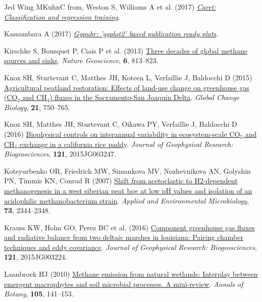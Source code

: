 \documentclass[
  12pt,
]{article}
\newlength{\cslhangindent}
\newenvironment{CSLReferences}[2] %
 {\begin{list}{}{%
  \setlength{\itemindent}{0pt}
  \setlength{\leftmargin}{0pt}
  \setlength{\parsep}{0pt}
  \ifodd #1
   \setlength{\leftmargin}{\cslhangindent}
   \setlength{\itemindent}{-1\cslhangindent}
  \fi
  \setlength{\itemsep}{#2\baselineskip}}}
 {\end{list}}
\begin{document}
\begin{CSLReferences}{1}{0}
Jed Wing MKuhnC from, Weston S, Williams A et al. (2017)
\emph{\emph{\href{https://CRAN.R-project.org/package=caret}{Caret:
Classification and regression training}}}.

Kassambara A (2017)
\emph{\emph{\href{https://CRAN.R-project.org/package=ggpubr}{Ggpubr:
'ggplot2' based publication ready plots}}}.

Kirschke S, Bousquet P, Ciais P et al. (2013)
\href{https://doi.org/10.1038/ngeo1955}{Three decades of global methane
sources and sinks}. \emph{Nature Geoscience}, \textbf{6}, 813--823.

Knox SH, Sturtevant C, Matthes JH, Koteen L, Verfaillie J, Baldocchi D
(2015) \href{https://doi.org/10.1111/gcb.12745}{Agricultural peatland
restoration: Effects of land-use change on greenhouse gas ({CO}\(_2\)
and {CH}\(_4\)) fluxes in the {Sacramento-San Joaquin Delta}}.
\emph{Global Change Biology}, \textbf{21}, 750--765.

Knox SH, Matthes JH, Sturtevant C, Oikawa PY, Verfaillie J, Baldocchi D
(2016) \href{https://doi.org/10.1002/2015JG003247}{Biophysical controls
on interannual variability in ecosystem-scale {CO}\(_2\) and {CH}\(_4\)
exchange in a california rice paddy}. \emph{Journal of Geophysical
Research: Biogeosciences}, \textbf{121}, 2015JG003247.

Kotsyurbenko OR, Friedrich MW, Simankova MV, Nozhevnikova AN, Golyshin
PN, Timmis KN, Conrad R (2007)
\href{https://doi.org/10.1128/AEM.02413-06}{Shift from acetoclastic to
H2-dependent methanogenesis in a west siberian peat bog at low {pH}
values and isolation of an acidophilic methanobacterium strain}.
\emph{Applied and Environmental Microbiology}, \textbf{73}, 2344--2348.

Krauss KW, Holm GO, Perez BC et al. (2016)
\href{https://doi.org/10.1002/2015JG003224}{Component greenhouse gas
fluxes and radiative balance from two deltaic marshes in louisiana:
Pairing chamber techniques and eddy covariance}. \emph{Journal of
Geophysical Research: Biogeosciences}, \textbf{121}, 2015JG003224.

Laanbroek HJ (2010) \href{https://doi.org/10.1093/aob/mcp201}{Methane
emission from natural wetlands: Interplay between emergent macrophytes
and soil microbial processes. A mini-review}. \emph{Annals of Botany},
\textbf{105}, 141--153.


\end{CSLReferences}
\end{document}
